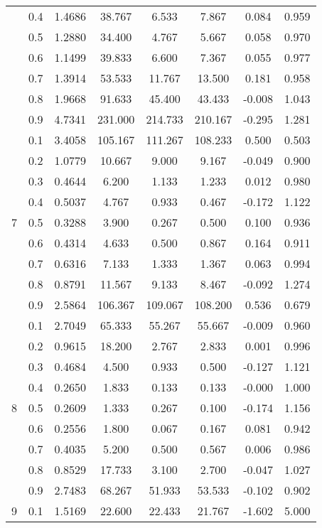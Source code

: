 \documentclass[11pt,a4paper]{report}
\begin{document}
\begin{longtable}{ | c | c || c | c | c | c | c | c | }
 & 0.4 & 1.4686 & 38.767 & 6.533 & 7.867 & 0.084 & 0.959 \\
 & 0.5 & 1.2880 & 34.400 & 4.767 & 5.667 & 0.058 & 0.970 \\
 & 0.6 & 1.1499 & 39.833 & 6.600 & 7.367 & 0.055 & 0.977 \\
 & 0.7 & 1.3914 & 53.533 & 11.767 & 13.500 & 0.181 & 0.958 \\
 & 0.8 & 1.9668 & 91.633 & 45.400 & 43.433 & -0.008 & 1.043 \\
 & 0.9 & 4.7341 & 231.000 & 214.733 & 210.167 & -0.295 & 1.281 \\
 \hline
\multirow{9}{*}{7} & 0.1 & 3.4058 & 105.167 & 111.267 & 108.233 & 0.500 & 0.503 \\
 & 0.2 & 1.0779 & 10.667 & 9.000 & 9.167 & -0.049 & 0.900 \\
 & 0.3 & 0.4644 & 6.200 & 1.133 & 1.233 & 0.012 & 0.980 \\
 & 0.4 & 0.5037 & 4.767 & 0.933 & 0.467 & -0.172 & 1.122 \\
 & 0.5 & 0.3288 & 3.900 & 0.267 & 0.500 & 0.100 & 0.936 \\
 & 0.6 & 0.4314 & 4.633 & 0.500 & 0.867 & 0.164 & 0.911 \\
 & 0.7 & 0.6316 & 7.133 & 1.333 & 1.367 & 0.063 & 0.994 \\
 & 0.8 & 0.8791 & 11.567 & 9.133 & 8.467 & -0.092 & 1.274 \\
 & 0.9 & 2.5864 & 106.367 & 109.067 & 108.200 & 0.536 & 0.679 \\
 \hline
\multirow{9}{*}{8} & 0.1 & 2.7049 & 65.333 & 55.267 & 55.667 & -0.009 & 0.960 \\
 & 0.2 & 0.9615 & 18.200 & 2.767 & 2.833 & 0.001 & 0.996 \\
 & 0.3 & 0.4684 & 4.500 & 0.933 & 0.500 & -0.127 & 1.121 \\
 & 0.4 & 0.2650 & 1.833 & 0.133 & 0.133 & -0.000 & 1.000 \\
 & 0.5 & 0.2609 & 1.333 & 0.267 & 0.100 & -0.174 & 1.156 \\
 & 0.6 & 0.2556 & 1.800 & 0.067 & 0.167 & 0.081 & 0.942 \\
 & 0.7 & 0.4035 & 5.200 & 0.500 & 0.567 & 0.006 & 0.986 \\
 & 0.8 & 0.8529 & 17.733 & 3.100 & 2.700 & -0.047 & 1.027 \\
 & 0.9 & 2.7483 & 68.267 & 51.933 & 53.533 & -0.102 & 0.902 \\
 \hline
\multirow{9}{*}{9} & 0.1 & 1.5169 & 22.600 & 22.433 & 21.767 & -1.602 & 5.000 \\

\end{longtable}
\end{document}

